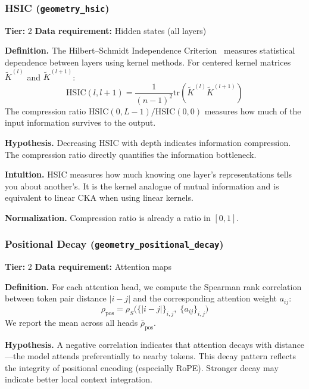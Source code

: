 \documentclass{article}
\begin{document}
\subsubsection{HSIC (\texttt{geometry\_hsic})}
\label{app:hsic}

\textbf{Tier:} 2 \quad \textbf{Data requirement:} Hidden states (all layers)

\textbf{Definition.}
The Hilbert--Schmidt Independence Criterion~\citep{gretton2005measuring} measures statistical dependence between layers using kernel methods. For centered kernel matrices $\tilde{K}^{(l)}$ and $\tilde{K}^{(l+1)}$:
\begin{equation}
  \text{HSIC}(l, l+1) = \frac{1}{(n-1)^2} \text{tr}(\tilde{K}^{(l)} \tilde{K}^{(l+1)})
\end{equation}
The compression ratio $\text{HSIC}(0, L-1) / \text{HSIC}(0, 0)$ measures how much of the input information survives to the output.

\textbf{Hypothesis.}
Decreasing HSIC with depth indicates information compression. The compression ratio directly quantifies the information bottleneck.

\textbf{Intuition.}
HSIC measures how much knowing one layer's representations tells you about another's. It is the kernel analogue of mutual information and is equivalent to linear CKA when using linear kernels.

\textbf{Normalization.} Compression ratio is already a ratio in $[0, 1]$.

\subsubsection{Positional Decay (\texttt{geometry\_positional\_decay})}
\label{app:positional-decay}

\textbf{Tier:} 2 \quad \textbf{Data requirement:} Attention maps

\textbf{Definition.}
For each attention head, we compute the Spearman rank correlation between token pair distance $|i - j|$ and the corresponding attention weight $a_{ij}$:
\begin{equation}
  \rho_{\text{pos}} = \rho_S\!\bigl(\{|i-j|\}_{i,j},\; \{a_{ij}\}_{i,j}\bigr)
\end{equation}
We report the mean across all heads $\bar\rho_{\text{pos}}$.

\textbf{Hypothesis.}
A negative correlation indicates that attention decays with distance---the model attends preferentially to nearby tokens. This decay pattern reflects the integrity of positional encoding (especially RoPE). Stronger decay may indicate better local context integration.
\end{document}
